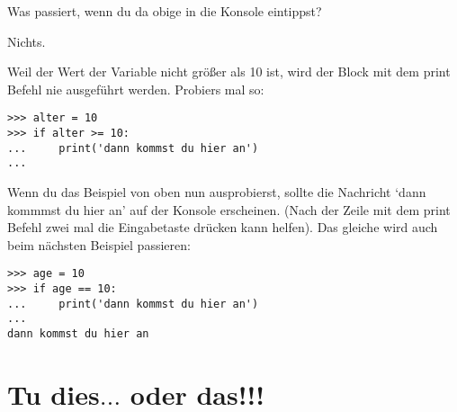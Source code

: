 \noindent
Was passiert, wenn du da obige in die Konsole eintippst?
\par
\noindent
Nichts.
\par
\noindent
Weil der Wert der Variable  nicht größer als 10 ist, wird der Block mit dem print Befehl nie ausgeführt werden. Probiers mal so:

\begin{Verbatim}[frame=single]
>>> alter = 10
>>> if alter >= 10:
...     print('dann kommst du hier an')
...
\end{Verbatim}

Wenn du das Beispiel von oben nun ausprobierst, sollte die Nachricht `dann kommmst du hier an' auf der Konsole erscheinen. (Nach der Zeile mit dem print Befehl zwei mal die Eingabetaste drücken kann helfen). Das gleiche wird auch beim nächsten Beispiel passieren:

\begin{Verbatim}[frame=single]
>>> age = 10
>>> if age == 10:
...     print('dann kommst du hier an')
...
dann kommst du hier an
\end{Verbatim}

\section{Tu dies\texorpdfstring{$\ldots$}{...} oder das!!!}

